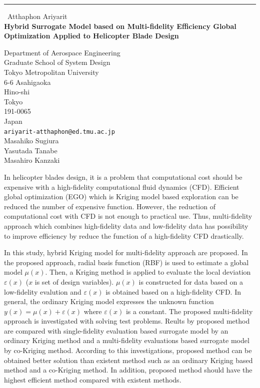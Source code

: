 \documentclass{report}
\begin{document}
\begin{center}
\rule{6in}{1pt} \
{\large Atthaphon Ariyarit \\
{\bf Hybrid Surrogate Model based on Multi-fidelity Efficiency Global Optimization Applied to Helicopter Blade Design}}

Department of Aerospace Engineering \\ Graduate School of System Design \\ Tokyo Metropolitan University \\ 6-6 Asahigaoka \\ Hino-shi \\ Tokyo \\ 191-0065 \\ Japan
\\
{\tt ariyarit-atthaphon@ed.tmu.ac.jp}\\
Masahiko Sugiura\\
Yasutada Tanabe\\
Masahiro Kanzaki\end{center}

In helicopter blades design, it is a problem that computational cost
should be expensive with a high-fidelity computational fluid dynamics
(CFD). Efficient global optimization (EGO) which is Kriging model based
exploration can be reduced the number of expensive function. However, the
reduction of computational cost with CFD is not enough to practical use.
Thus, multi-fidelity approach which combines high-fidelity data and
low-fidelity data has possibility to improve efficiency by reduce the
function of a high-fidelity CFD drastically.

In this study, hybrid Kriging model for multi-fidelity approach are
proposed. In the proposed approach, radial basis function (RBF) is used
to estimate a global model $\mu(x)$. Then, a Kriging method is applied to
evaluate the local deviation $\varepsilon(x)$ ($x$ is set of design
variables). $\mu(x)$ is constructed for data based on a low-fidelity
evalution and $\varepsilon(x)$ is obtained based on a high-fidelity CFD.
In general, the ordinary Kriging model expresses the unknown function
$y(x)=\mu(x)+\varepsilon(x)$ where $\varepsilon(x)$ is a constant. The
proposed multi-fidelity approach is investigated with solving test
problems. Reults by proposed method are compared with single-fidelity
evaluation based surrogate model by an ordinary Kriging method and a
multi-fidelity evaluations based surrogate model by co-Kriging method.
According to this investigations, proposed method can be obtained better
solution than existent method such as an ordinary Kriging based method
and a co-Kriging method. In addition, proposed method should have the
highest efficient method compared with existent methods.
\end{document}
